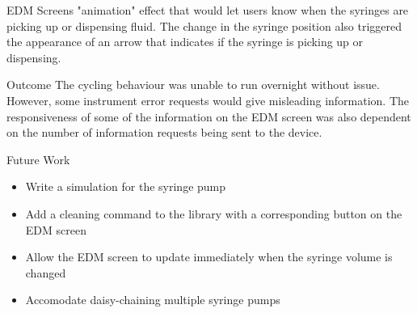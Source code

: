 \documentclass[a0paper,landscape,fontscale=0.32]{baposter}
\begin{document}
\begin{poster}
\begin{posterbox}[name=edmscreenexp,column=3,below=edmimage]{EDM Screens}
    "animation" effect that would let users know when the syringes are picking up or dispensing fluid. The
    change in the syringe position also triggered the appearance of an arrow that indicates if the syringe is
    picking up or dispensing.
\end{posterbox}
\begin{posterbox}[name=outcome,column=3,below=edmscreenexp]{Outcome}
The cycling behaviour was unable to run overnight without issue. However, some instrument error requests would
give misleading information. The responsiveness of some of the information on the EDM screen was also
    dependent on the number of information requests being sent to the device.
\end{posterbox}
\begin{posterbox}[name=futurework,column=3,above=bottom]{Future Work}
 \begin{itemize}
    \item Write a simulation for the syringe pump
    \item Add a cleaning command to the library with a corresponding button on the EDM screen
    \item Allow the EDM screen to update immediately when the syringe volume is changed
    \item Accomodate daisy-chaining multiple syringe pumps
\end{itemize}
\end{posterbox}

\end{poster}
\end{document}
